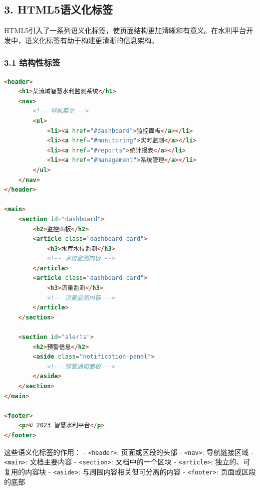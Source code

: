 \subsection{3.
HTML5语义化标签}\label{html5ux8bedux4e49ux5316ux6807ux7b7e}

HTML5引入了一系列语义化标签，使页面结构更加清晰和有意义。在水利平台开发中，语义化标签有助于构建更清晰的信息架构。

\subsubsection{3.1 结构性标签}\label{ux7ed3ux6784ux6027ux6807ux7b7e}

\begin{lstlisting}[language=HTML]
<header>
    <h1>某流域智慧水利监测系统</h1>
    <nav>
        <!-- 导航菜单 -->
        <ul>
            <li><a href="#dashboard">监控面板</a></li>
            <li><a href="#monitoring">实时监测</a></li>
            <li><a href="#reports">统计报表</a></li>
            <li><a href="#management">系统管理</a></li>
        </ul>
    </nav>
</header>

<main>
    <section id="dashboard">
        <h2>监控面板</h2>
        <article class="dashboard-card">
            <h3>水库水位监测</h3>
            <!-- 水位监测内容 -->
        </article>
        <article class="dashboard-card">
            <h3>流量监测</h3>
            <!-- 流量监测内容 -->
        </article>
    </section>
    
    <section id="alerts">
        <h2>预警信息</h2>
        <aside class="notification-panel">
            <!-- 预警通知面板 -->
        </aside>
    </section>
</main>

<footer>
    <p>© 2023 智慧水利平台</p>
</footer>
\end{lstlisting}

这些语义化标签的作用： - \passthrough{\lstinline!<header>!}:
页面或区段的头部 - \passthrough{\lstinline!<nav>!}: 导航链接区域 -
\passthrough{\lstinline!<main>!}: 文档主要内容 -
\passthrough{\lstinline!<section>!}: 文档中的一个区块 -
\passthrough{\lstinline!<article>!}: 独立的、可复用的内容块 -
\passthrough{\lstinline!<aside>!}: 与周围内容相关但可分离的内容 -
\passthrough{\lstinline!<footer>!}: 页面或区段的底部

